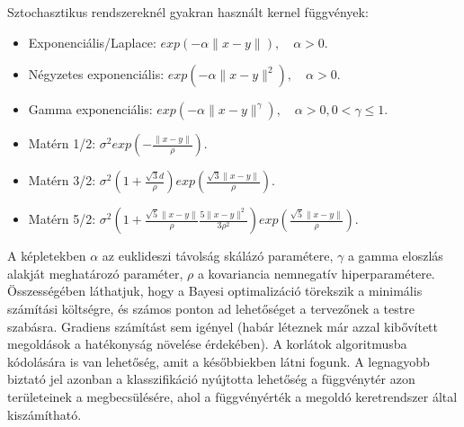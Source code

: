 Sztochasztikus rendszereknél gyakran használt kernel függvények:
\begin{itemize}
	\item Exponenciális/Laplace: $exp(-\alpha\|x-y\|), \quad \alpha>0$.
	\item Négyzetes exponenciális: $exp(-\alpha\|x-y\|^2), \quad \alpha>0$.
	\item Gamma exponenciális: $exp(-\alpha\|x-y\|^\gamma), \quad \alpha>0, 0<\gamma\le1$.
	\item Matérn 1/2: $\sigma^2exp\left( -\frac{\|x-y\|}{\rho}\right)$. 
	\item Matérn 3/2: $\sigma^2\left( 1+\frac{\sqrt{3}d}{\rho}\right) exp\left(\frac{\sqrt{3}\|x-y\|}{\rho}\right)$.
	\item Matérn 5/2: $\sigma^2\left( 1+\frac{\sqrt{5}\|x-y\|}{\rho}\frac{5\|x-y\|^2}{3\rho^2}\right) exp\left(\frac{\sqrt{5}\|x-y\|}{\rho}\right)$.
\end{itemize}
A képletekben $\alpha$ az euklideszi távolság skálázó paramétere, $\gamma$ a gamma eloszlás alakját meghatározó paraméter, $\rho$ a kovariancia nemnegatív hiperparamétere.\\

Összességében láthatjuk, hogy a Bayesi optimalizáció törekszik a minimális számítási költségre, és számos ponton ad lehetőséget a tervezőnek a testre szabásra. Gradiens számítást sem igényel (habár léteznek már azzal kibővített megoldások a hatékonyság növelése érdekében). 
A korlátok algoritmusba kódolására is van lehetőség, amit a későbbiekben látni fogunk. 
A legnagyobb biztató jel azonban a klasszifikáció nyújtotta lehetőség a függvénytér azon területeinek a megbecsülésére, ahol a függvényérték a megoldó keretrendszer által kiszámítható.

